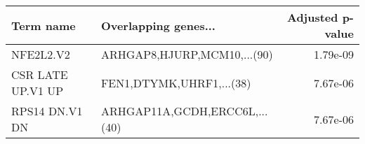 \begin{tabular}{llr}
\toprule
        Term name &          Overlapping genes... &  Adjusted p-value \\
\midrule
        NFE2L2.V2 &   ARHGAP8,HJURP,MCM10,...(90) &          1.79e-09 \\
CSR LATE UP.V1 UP &      FEN1,DTYMK,UHRF1,...(38) &          7.67e-06 \\
   RPS14 DN.V1 DN & ARHGAP11A,GCDH,ERCC6L,...(40) &          7.67e-06 \\
\bottomrule
\end{tabular}
